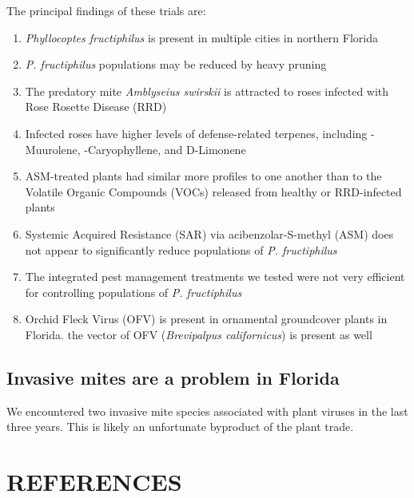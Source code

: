 \documentclass[12pt,final,CPage]{ufthesis}
\begin{document}
{  The principal findings of these trials are:
  \begin{enumerate}
  \def\labelenumi{\arabic{enumi}.}
  \tightlist
  \item
    \emph{Phyllocoptes fructiphilus} is present in multiple cities in northern Florida
  \item
    \emph{P. fructiphilus} populations may be reduced by heavy pruning
  \item
    The predatory mite \emph{Amblyseius swirskii} is attracted to roses infected with Rose Rosette Disease (RRD)
  \item
    Infected roses have higher levels of defense-related terpenes, including \textgamma-Muurolene, \textbeta-Caryophyllene, and D-Limonene
  \item
    ASM-treated plants had similar more profiles to one another than to the Volatile Organic Compounds (VOCs) released from healthy or RRD-infected plants
  \item
    Systemic Acquired Resistance (SAR) via acibenzolar-S-methyl (ASM) does not appear to significantly reduce populations of \emph{P. fructiphilus}
  \item
    The integrated pest management treatments we tested were not very efficient for controlling populations of \emph{P. fructiphilus}
  \item
    Orchid Fleck Virus (OFV) is present in ornamental groundcover plants in Florida. the vector of OFV (\emph{Brevipalpus californicus}) is present as well
  \end{enumerate}
  \hypertarget{invasive-mites-are-a-problem-in-florida}{%
  \section{Invasive mites are a problem in Florida}\label{invasive-mites-are-a-problem-in-florida}}

  We encountered two invasive mite species associated with plant viruses in the last three years. This is likely an unfortunate byproduct of the plant trade.

  \hypertarget{references}{%
  \chapter*{REFERENCES}\label{references}}


  \noindent

}
\end{document}
